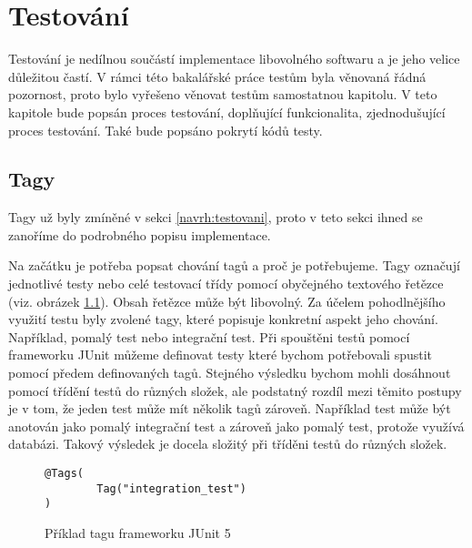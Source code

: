 \chapter{Testování}\label{testovani}
Testování je nedílnou součástí implementace libovolného softwaru a je jeho velice důležitou častí. V rámci této bakalářské práce testům byla věnovaná řádná pozornost, proto bylo vyřešeno věnovat testům samostatnou kapitolu. V teto kapitole bude popsán proces testování, doplňující funkcionalita, zjednodušující proces testování. Také bude popsáno pokrytí kódů testy.
\section{Tagy}\label{testovani:tagy}
    Tagy už byly zmíněné v sekci \ref{navrh:testovani}, proto v teto sekci ihned se zanoříme do podrobného popisu implementace. 
    
    Na začátku je potřeba popsat chování tagů a proč je potřebujeme. Tagy označují jednotlivé testy nebo celé testovací třídy pomocí obyčejného textového řetězce (viz. obrázek \ref{code:tag-junit-5}). Obsah řetězce může být libovolný. Za účelem pohodlnějšího využití testu byly zvolené tagy, které popisuje konkretní aspekt jeho chování. Například, pomalý test nebo integrační test. Při spouštěni testů pomocí frameworku JUnit můžeme definovat testy které bychom potřebovali spustit pomocí předem definovaných tagů. Stejného výsledku bychom mohli dosáhnout pomocí třídění testů do různých složek, ale podstatný rozdíl mezi těmito postupy je v tom, že jeden test může mít několik tagů zároveň. Například test může být anotován jako pomalý integrační test a zároveň jako pomalý test, protože využívá databázi. Takový výsledek je docela složitý při tříděni testů do různých složek.
    \begin{figure}
        \begin{verbatim}
@Tags(
        Tag("integration_test")
)
        \end{verbatim}
        \caption{Příklad tagu frameworku JUnit 5} 
        \label{code:tag-junit-5}
    \end{figure}
    
